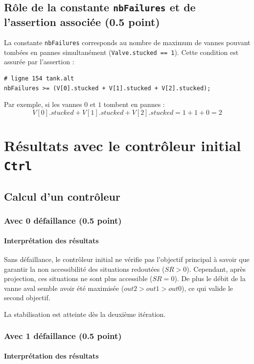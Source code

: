 \documentclass[a4paper]{book}
\begin{document}
\subsection{Rôle de la constante {\tt nbFailures} et de l'assertion associée (0.5 point)}

La constante \texttt{nbFailures} corresponds au nombre de maximum de vannes
pouvant tombées en pannes simultanément (\texttt{Valve.stucked == 1}). Cette
condition est assurée par l'assertion :
\begin{verbatim}
# ligne 154 tank.alt
nbFailures >= (V[0].stucked + V[1].stucked + V[2].stucked);
\end{verbatim}

Par exemple, si les vannes $0$ et $1$ tombent en pannes :
$$
V[0].stucked + V[1].stucked + V[2].stucked = 1 + 1 + 0 = 2
$$

\section{Résultats avec le contrôleur initial {\tt Ctrl}}
\subsection{Calcul d'un contrôleur}
\subsubsection{Avec 0 défaillance (0.5 point)}

\paragraph{Interprétation des résultats}

Sans défaillance, le contrôleur initial ne vérifie pas l'objectif principal à savoir que
garantir la non accessibilité des situations redoutées ($SR > 0$).
Cependant, après projection, ces situations ne sont plus accessible ($SR = 0$).
De plus le débit de la vanne aval semble avoir été maximisée ($out2 > out1 > out0$), ce qui
valide le second objectif.

La stabilisation est atteinte dès la deuxième itération.

\subsubsection{Avec 1 défaillance (0.5 point)}

\paragraph{Interprétation des résultats}
\end{document}
